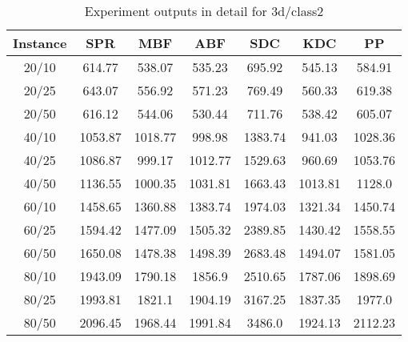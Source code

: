 \begin{table}[ht!]
    \caption{Experiment outputs in detail for 3d/class2}
    \centering
    \begin{tabular}{@{}ccccccc@{}}
        \toprule
        {\bfseries Instance} & {\bfseries SPR} & {\bfseries MBF}
        & {\bfseries ABF} & {\bfseries SDC} & {\bfseries KDC} & {\bfseries PP}\\
        \midrule
        20/10 & 614.77 & 538.07 & 535.23 & 695.92 & 545.13 & 584.91\\
        20/25 & 643.07 & 556.92 & 571.23 & 769.49 & 560.33 & 619.38\\
        20/50 & 616.12 & 544.06 & 530.44 & 711.76 & 538.42 & 605.07\\
        40/10 & 1053.87 & 1018.77 & 998.98 & 1383.74 & 941.03 & 1028.36\\
        40/25 & 1086.87 & 999.17 & 1012.77 & 1529.63 & 960.69 & 1053.76\\
        40/50 & 1136.55 & 1000.35 & 1031.81 & 1663.43 & 1013.81 & 1128.0\\
        60/10 & 1458.65 & 1360.88 & 1383.74 & 1974.03 & 1321.34 & 1450.74\\
        60/25 & 1594.42 & 1477.09 & 1505.32 & 2389.85 & 1430.42 & 1558.55\\
        60/50 & 1650.08 & 1478.38 & 1498.39 & 2683.48 & 1494.07 & 1581.05\\
        80/10 & 1943.09 & 1790.18 & 1856.9 & 2510.65 & 1787.06 & 1898.69\\
        80/25 & 1993.81 & 1821.1 & 1904.19 & 3167.25 & 1837.35 & 1977.0\\
        80/50 & 2096.45 & 1968.44 & 1991.84 & 3486.0 & 1924.13 & 2112.23\\
        \bottomrule
    \end{tabular}
\end{table}